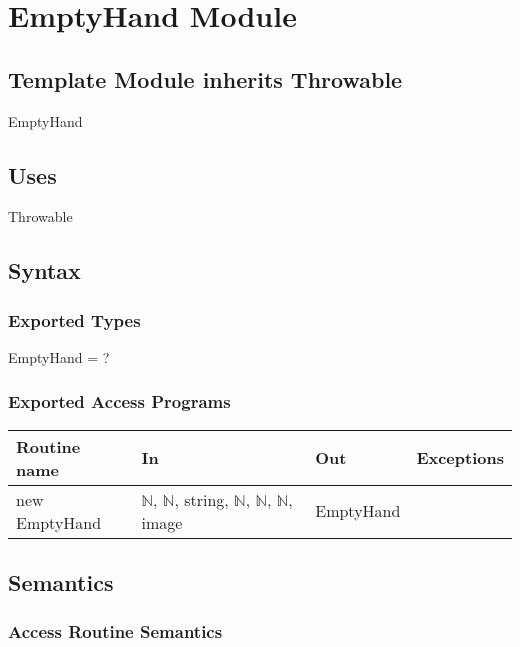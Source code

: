 \documentclass[12pt]{article}
\begin{document}
\newpage

\section*{EmptyHand Module}

\subsection*{Template Module inherits Throwable}

EmptyHand

\subsection*{Uses}

Throwable

\subsection*{Syntax}

\subsubsection*{Exported Types}

EmptyHand = ?

\subsubsection*{Exported Access Programs}

\begin{tabular}{| l | l | l | l |}
\hline
\textbf{Routine name} & \textbf{In} & \textbf{Out} & \textbf{Exceptions}\\
\hline
new EmptyHand & $\mathbb{N}$, $\mathbb{N}$, string, $\mathbb{N}$, $\mathbb{N}$, $\mathbb{N}$, image & EmptyHand & ~\\
\hline
\end{tabular}

\subsection*{Semantics}

\subsubsection*{Access Routine Semantics}
\end{document}
